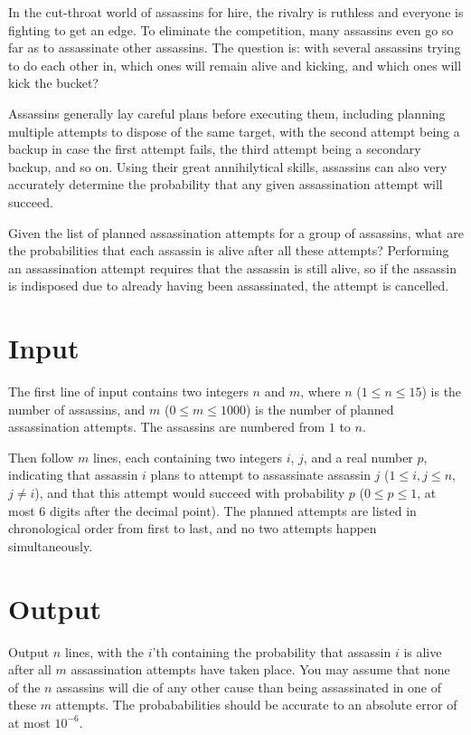 
\noindent
In the cut-throat world of assassins for hire, the rivalry is
ruthless and everyone is fighting to get an edge.  To eliminate the
competition, many assassins even go so far as to assassinate other
assassins.  The question is: with several assassins trying to do
each other in, which ones will remain alive and kicking, and which
ones will kick the bucket?

Assassins generally lay careful plans before executing them, including
planning multiple attempts to dispose of the same target, with the
second attempt being a backup in case the first attempt fails, the
third attempt being a secondary backup, and so on.  Using their great
annihilytical skills, assassins can also very accurately determine the
probability that any given assassination attempt will succeed.

Given the list of planned assassination attempts for a group of
assassins, what are the probabilities that each assassin is alive
after all these attempts?  Performing an assassination attempt
requires that the assassin is still alive, so if the assassin is
indisposed due to already having been assassinated, the attempt is
cancelled.

\section*{Input}

The first line of input contains two integers $n$ and $m$, where $n$
($1 \le n \le 15$) is the number of assassins, and $m$ ($0 \le m \le
1000$) is the number of planned assassination attempts.  The assassins
are numbered from $1$ to $n$.

Then follow $m$ lines, each containing two integers $i$, $j$, and a
real number $p$, indicating that assassin $i$ plans to attempt to
assassinate assassin $j$ ($1 \le i, j \le n$, $j \ne i$), and that
this attempt would succeed with probability $p$ ($0 \le p \le 1$, at
most $6$ digits after the decimal point).  The planned attempts are
listed in chronological order from first to last, and no two attempts
happen simultaneously.

\section*{Output}

Output $n$ lines, with the $i$'th containing the probability that
assassin $i$ is alive after all $m$ assassination attempts have taken
place.  You may assume that none of the $n$ assassins will die of any
other cause than being assassinated in one of these $m$ attempts.  The
probababilities should be accurate to an absolute error of at most
$10^{-6}$.
